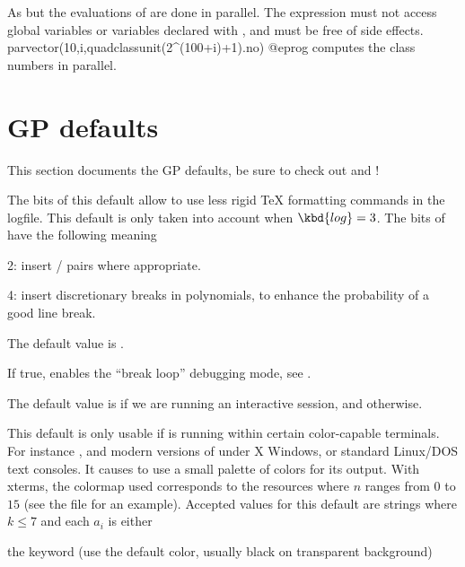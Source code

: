 {\label{se:parvector}
As  but the evaluations of  are done in
parallel. The expression  must not access global variables or
variables declared with , and must be free of side effects.
\bprog
parvector(10,i,quadclassunit(2^(100+i)+1).no)
@eprog\noindent
computes the class numbers in parallel.

\section{GP defaults}
\label{se:gp_defaults} This section documents the GP defaults, be sure to
check out  and  !


\label{se:def,TeXstyle}
The bits of this default allow
 to use less rigid TeX formatting commands in the logfile. This
default is only taken into account when $\kbd{log} = 3$. The bits of
 have the following meaning

2: insert  /  pairs where appropriate.

4: insert discretionary breaks in polynomials, to enhance the probability of
a good line break.

The default value is .

\label{se:def,breakloop}
If true, enables the ``break loop'' debugging mode, see
.

The default value is  if we are running an interactive 
session, and  otherwise.

\label{se:def,colors}
This default is only usable if 
is running within certain color-capable terminals. For instance ,
 and modern versions of  under X Windows, or
standard Linux/DOS text consoles. It causes  to use a small palette of
colors for its output. With xterms, the colormap used corresponds to the
resources  where $n$ ranges from $0$ to $15$ (see the
file  for an example). Accepted values for this
default are strings  where $k\le7$ and each
$a_i$ is either

\noindent\item the keyword  (use the default color, usually
black on transparent background)

}
